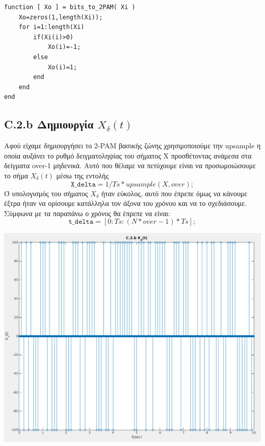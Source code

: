 \documentclass[11pt]{article}
\begin{document}
\begin{lstlisting}[caption = {\texttt{bits\_to\_2PAM.m}}]
function [ Xo ] = bits_to_2PAM( Xi )
    Xo=zeros(1,length(Xi));    
    for i=1:length(Xi)    
        if(Xi(i)>0)          
            Xo(i)=-1;        
        else
            Xo(i)=1;    
        end
    end
end
\end{lstlisting}
    
    
    \subsection*{C.2.b Δημιουργία $X_δ(t)$}
    Αφού είχαμε δημιουργήσει το 2-PAM βασικής ζώνης χρησιμοποιούμε την upsample η οποία αυξάνει το ρυθμό δειγματοληψίας του σήματος Χ προσθέτοντας ανάμεσα στα δείγματα over-1 μηδενικά. Αυτό που θέλαμε να πετύχουμε είναι να προσωμοιώσουμε το σήμα $X_δ(t)$ μέσω της εντολής 
    $$\texttt{X\_delta} = 1/T s * upsample(X, over);$$
    Ό υπολογισμός του σήματος $X_δ$ ήταν εύκολος, αυτό που έπρεπε όμως να κάνουμε έξτρα ήταν να ορίσουμε κατάλληλα τον άξονα του χρόνου και να το σχεδιάσουμε. Σύμφωνα με τα παραπάνω ο χρόνος θα έπρεπε να είναι:
    $$\texttt{t\_delta} = [ 0 : Ts : (N*over-1)*Ts ];$$

    \begin{center}
        \includegraphics[scale=0.35]{photos/C.2.b X_d(t)_screenshot.png}
    \end{center} 
    
\end{document}

